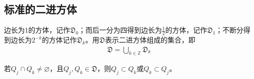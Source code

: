 \subsection*{标准的二进方体}
边长为1的方体，记作$\mathfrak{D}_0$；而后一分为四得到边长为$\frac{1}{2}$的方体，记作$\mathfrak{D}_1$；不断分得到边长为$2^{-k}$的方体记作$\mathfrak{D}_k$。用$\mathfrak{D}$表示二进方体组成的集合，即
\begin{align*}
    \mathfrak{D} = \bigcup\limits_{k\in\mathbb{Z}} \mathfrak{D}_k
\end{align*}

\begin{proposition}
    若$Q_j\cap Q_k\neq \varnothing$，且$Q_j,Q_k\in\mathfrak{D}$，则$Q_j\subset Q_k$或$Q_k\subset Q_j$。
\end{proposition}





